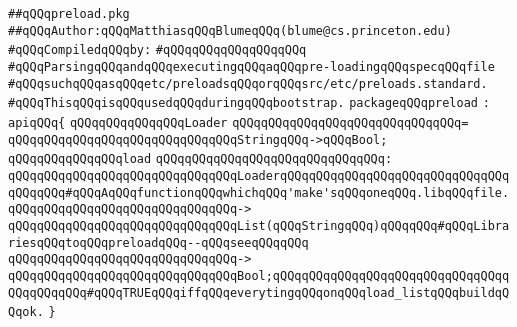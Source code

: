 \label{src/app/makelib/main/preload.pkg}
\verb|##qQQqpreload.pkg|\newline
\verb|##qQQqAuthor:qQQqMatthiasqQQqBlumeqQQq(blume@cs.princeton.edu)|\newline
\newline
\verb|#qQQqCompiledqQQqby:|\newline
\verb|#qQQqqQQqqQQqqQQqqQQq|\newline
\newline
\verb|#qQQqParsingqQQqandqQQqexecutingqQQqaqQQqpre-loadingqQQqspecqQQqfile|\newline
\verb|#qQQqsuchqQQqasqQQqetc/preloadsqQQqorqQQqsrc/etc/preloads.standard.|\newline
\verb|#qQQqThisqQQqisqQQqusedqQQqduringqQQqbootstrap.|\newline
\newline
\verb|packageqQQqpreload|\newline
\verb|:|\newline
\verb|apiqQQq{|\newline
\verb|qQQqqQQqqQQqqQQqLoader|\newline
\verb|qQQqqQQqqQQqqQQqqQQqqQQqqQQqqQQq=|\newline
\verb|qQQqqQQqqQQqqQQqqQQqqQQqqQQqqQQqStringqQQq->qQQqBool;|\newline
\newline
\verb|qQQqqQQqqQQqqQQqload|\newline
\verb|qQQqqQQqqQQqqQQqqQQqqQQqqQQqqQQq:|\newline
\verb|qQQqqQQqqQQqqQQqqQQqqQQqqQQqqQQqLoaderqQQqqQQqqQQqqQQqqQQqqQQqqQQqqQQqqQQqqQQq#qQQqAqQQqfunctionqQQqwhichqQQq'make'sqQQqoneqQQq.libqQQqfile.|\newline
\verb|qQQqqQQqqQQqqQQqqQQqqQQqqQQqqQQq->|\newline
\verb|qQQqqQQqqQQqqQQqqQQqqQQqqQQqqQQqList(qQQqStringqQQq)qQQqqQQq#qQQqLibrariesqQQqtoqQQqpreloadqQQq--qQQqseeqQQqqQQq|\newline
\verb|qQQqqQQqqQQqqQQqqQQqqQQqqQQqqQQq->|\newline
\verb|qQQqqQQqqQQqqQQqqQQqqQQqqQQqqQQqBool;qQQqqQQqqQQqqQQqqQQqqQQqqQQqqQQqqQQqqQQqqQQq#qQQqTRUEqQQqiffqQQqeverytingqQQqonqQQqload_listqQQqbuildqQQqok.|\newline
\verb|}|\newline
